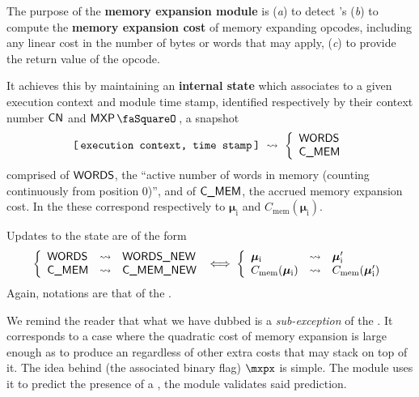 The purpose of the \textbf{memory expansion module} is
(\emph{a}) to detect \mxpxSH{}'s
(\emph{b}) to compute the \textbf{memory expansion cost} of memory expanding opcodes, including any linear cost in the number of bytes or words that may apply,
(\emph{c}) to provide the return value of the  opcode.

It achieves this by maintaining an \textbf{internal state} which associates to a given
execution context and \mxpMod{} module time stamp,
identified respectively by their context number $\textsf{CN}$ and $\mxpStamp$,
a snapshot
\[
	\texttt{[\,execution context, time stamp\,]}
	~ \rightsquigarrow ~
	\left\{ \begin{array}{l}
		\textsf{WORDS} \\
		\textsf{C\_MEM}  \\
	\end{array} \right.
\]
comprised of
$\textsf{WORDS}$, the ``active number of words in memory (counting continuously from position $0$)'', and of
$\textsf{C\_MEM}$,  the accrued memory expansion cost.
In the \cite{EYP} these correspond respectively to $\bm{\mu}_\text{i}$ and $C_\text{mem}(\bm{\mu}_\text{i})$.

Updates to the state are of the form
\[
	\left\{ \begin{array}{lcl}
		\textsf{WORDS} & \rightsquigarrow & \textsf{WORDS\_NEW} \\
		\textsf{C\_MEM}  & \rightsquigarrow & \textsf{C\_MEM\_NEW}  \\
	\end{array} \right.
	\iff
	\left\{ \begin{array}{lcl}
		\bm{\mu}_\text{i}               & \rightsquigarrow & \bm{\mu}_\text{i}'               \\
		C_\text{mem}(\bm{\mu}_\text{i}) & \rightsquigarrow & C_\text{mem}(\bm{\mu}_\text{i}') \\
	\end{array} \right.
\]
Again, notations are that of the \cite{EYP}.

We remind the reader that what we have dubbed \mxpxSH{} is a \emph{sub-exception} of the \oogxSH{}.
It corresponds to a case where the quadratic cost of memory expansion is large enough as to produce an \oogxSH{} regardless of other extra costs that may stack on top of it.
The idea behind (the associated binary flag) $\mxpx$ is simple.
The \hubMod{} module uses it to predict the presence of a \mxpxSH{}, the \mxpMod{} module validates said prediction.



